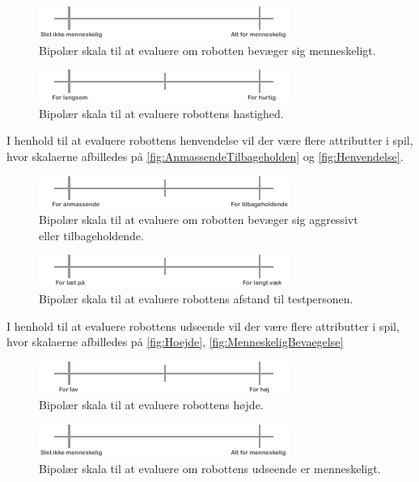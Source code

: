 \noindent
%
%
\begin{figure}[H]
\centering
\includegraphics[width =\textwidth]{Figure/Menneskelig} 
\caption{Bipolær skala til at evaluere om robotten bevæger sig menneskeligt.}
\label{fig:MenneskeligBevaegelse}
\end{figure}
\noindent
%
%
\begin{figure}[H]
\centering
\includegraphics[width =\textwidth]{Figure/Hastighed} 
\caption{Bipolær skala til at evaluere robottens hastighed.}
\label{fig:Hastighed}
\end{figure}
\noindent
%
I henhold til at evaluere robottens henvendelse vil der være flere attributter i spil, hvor skalaerne afbilledes på \autoref{fig:AnmassendeTilbageholden} og \autoref{fig:Henvendelse}.  
%
\begin{figure}[H]
\centering
\includegraphics[width =\textwidth]{Figure/AnmasendeTilbageholden} 
\caption{Bipolær skala til at evaluere om robotten bevæger sig aggressivt eller tilbageholdende.}
\label{fig:AnmassendeTilbageholden}
\end{figure}
\noindent
%
%
\begin{figure}[H]
\centering
\includegraphics[width =\textwidth]{Figure/Henvendelse} 
\caption{Bipolær skala til at evaluere robottens afstand til testpersonen.}
\label{fig:Henvendelse}
\end{figure}
\noindent
%
I henhold til at evaluere robottens udseende vil der være flere attributter i spil, hvor skalaerne afbilledes på \autoref{fig:Hoejde}, \autoref{fig:MenneskeligBevaegelse}
%
\begin{figure}[H]
\centering
\includegraphics[width =\textwidth]{Figure/Hoejde} 
\caption{Bipolær skala til at evaluere robottens højde.}
\label{fig:Hoejde}
\end{figure}
\noindent
%
%
\begin{figure}[H]
\centering
\includegraphics[width =\textwidth]{Figure/Menneskelig} 
\caption{Bipolær skala til at evaluere om robottens udseende er menneskeligt.}
\label{fig:MenneskeligUdseende}
\end{figure}
\noindent
%


